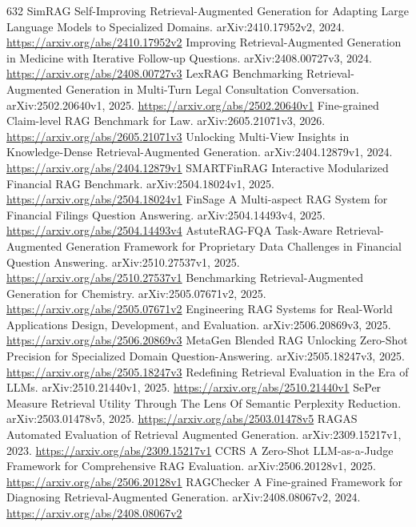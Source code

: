 \documentclass[11pt]{article}
\begin{document}
\begin{thebibliography}{632}
 SimRAG Self-Improving Retrieval-Augmented Generation for Adapting Large Language Models to Specialized Domains. arXiv:2410.17952v2, 2024. \url{https://arxiv.org/abs/2410.17952v2}
 Improving Retrieval-Augmented Generation in Medicine with Iterative Follow-up Questions. arXiv:2408.00727v3, 2024. \url{https://arxiv.org/abs/2408.00727v3}
 LexRAG Benchmarking Retrieval-Augmented Generation in Multi-Turn Legal Consultation Conversation. arXiv:2502.20640v1, 2025. \url{https://arxiv.org/abs/2502.20640v1}
 Fine-grained Claim-level RAG Benchmark for Law. arXiv:2605.21071v3, 2026. \url{https://arxiv.org/abs/2605.21071v3}
 Unlocking Multi-View Insights in Knowledge-Dense Retrieval-Augmented Generation. arXiv:2404.12879v1, 2024. \url{https://arxiv.org/abs/2404.12879v1}
 SMARTFinRAG Interactive Modularized Financial RAG Benchmark. arXiv:2504.18024v1, 2025. \url{https://arxiv.org/abs/2504.18024v1}
 FinSage A Multi-aspect RAG System for Financial Filings Question Answering. arXiv:2504.14493v4, 2025. \url{https://arxiv.org/abs/2504.14493v4}
 AstuteRAG-FQA Task-Aware Retrieval-Augmented Generation Framework for Proprietary Data Challenges in Financial Question Answering. arXiv:2510.27537v1, 2025. \url{https://arxiv.org/abs/2510.27537v1}
 Benchmarking Retrieval-Augmented Generation for Chemistry. arXiv:2505.07671v2, 2025. \url{https://arxiv.org/abs/2505.07671v2}
 Engineering RAG Systems for Real-World Applications Design, Development, and Evaluation. arXiv:2506.20869v3, 2025. \url{https://arxiv.org/abs/2506.20869v3}
 MetaGen Blended RAG Unlocking Zero-Shot Precision for Specialized Domain Question-Answering. arXiv:2505.18247v3, 2025. \url{https://arxiv.org/abs/2505.18247v3}
 Redefining Retrieval Evaluation in the Era of LLMs. arXiv:2510.21440v1, 2025. \url{https://arxiv.org/abs/2510.21440v1}
 SePer Measure Retrieval Utility Through The Lens Of Semantic Perplexity Reduction. arXiv:2503.01478v5, 2025. \url{https://arxiv.org/abs/2503.01478v5}
 RAGAS Automated Evaluation of Retrieval Augmented Generation. arXiv:2309.15217v1, 2023. \url{https://arxiv.org/abs/2309.15217v1}
 CCRS A Zero-Shot LLM-as-a-Judge Framework for Comprehensive RAG Evaluation. arXiv:2506.20128v1, 2025. \url{https://arxiv.org/abs/2506.20128v1}
 RAGChecker A Fine-grained Framework for Diagnosing Retrieval-Augmented Generation. arXiv:2408.08067v2, 2024. \url{https://arxiv.org/abs/2408.08067v2}

\end{thebibliography}
\end{document}
